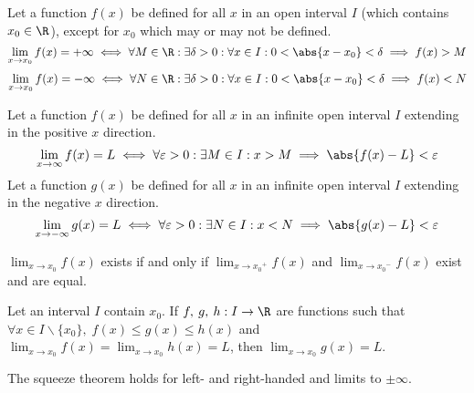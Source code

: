 \documentclass{article}
\begin{document}
%
\begin{definition}
    Let a function $f(x)$ be defined for all $x$ in an open interval $I$
    (which contains $x_0 \in \R$), except for $x_0$ which may or may not be defined.
    \begin{equation*}
        \lim_{x\to x_0} f(x) = +\infty \iff \forall M \in \R: \exists\delta>0: \forall x \in I: 0<\abs{x-x_0}<\delta \implies f(x) > M
    \end{equation*}
    \begin{equation*}
        \lim_{x\to x_0} f(x) = -\infty \iff \forall N \in \R: \exists\delta>0: \forall x \in I: 0<\abs{x-x_0}<\delta \implies f(x) < N
    \end{equation*}
\end{definition}
%
\begin{definition}
    Let a function $f(x)$ be defined for all $x$ in an infinite open interval $I$
    extending in the positive $x$ direction.
    \begin{equation*}
        \lim_{x\to\infty} f(x) = L \iff \forall \varepsilon>0: \exists M \in I: x>M \implies \abs{f(x)-L}<\varepsilon
    \end{equation*}
    Let a function $g(x)$ be defined for all $x$ in an infinite open interval $I$
    extending in the negative $x$ direction.
    \begin{equation*}
        \lim_{x\to-\infty} g(x) = L \iff \forall \varepsilon>0: \exists N \in I: x<N \implies \abs{g(x)-L}<\varepsilon
    \end{equation*}
\end{definition}
%
\begin{theorem}
    $\displaystyle\lim_{x\to x_0} f(x)$ exists if and only if
    $\displaystyle\lim_{x\to {x_0}^+} f(x)$ and $\displaystyle\lim_{x\to {x_0}^-} f(x)$
    exist and are equal.
\end{theorem}
%
\begin{theorem}
    Let an interval $I$ contain $x_0$.
    If $f,\:g,\:h : I \to \R$ are functions such that
    $\forall x \in I\backslash\{x_0\},\; f(x)\leqslant g(x)\leqslant h(x)$
    and
    $\displaystyle\lim_{x\to x_0} f(x) = \lim_{x\to x_0} h(x) = L$,
    then
    $\displaystyle\lim_{x\to x_0} g(x) = L$.
\end{theorem}
%
\begin{note}
    The squeeze theorem holds for left- and right-handed and limits to $\pm\infty$.
\end{note}
\end{document}
